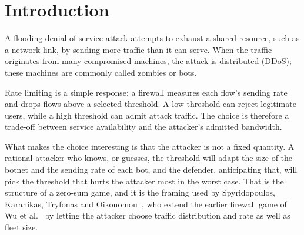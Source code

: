 \documentclass[conference]{IEEEtran}
\begin{document}
\section{Introduction}
A flooding denial-of-service attack attempts to exhaust a shared resource, such as a network link, by sending more traffic than it can serve. When the traffic originates from many compromised machines, the attack is distributed (DDoS); these machines are commonly called zombies or bots.

Rate limiting is a simple response: a firewall measures each flow's sending rate and drops flows above a selected threshold. A low threshold can reject legitimate users, while a high threshold can admit attack traffic. The choice is therefore a trade-off between service availability and the attacker's admitted bandwidth.

What makes the choice interesting is that the attacker is not a fixed quantity. A rational attacker who knows, or guesses, the threshold will adapt the size of the botnet and the sending rate of each bot, and the defender, anticipating that, will pick the threshold that hurts the attacker most in the worst case. That is the structure of a zero-sum game, and it is the framing used by Spyridopoulos, Karanikas, Tryfonas and Oikonomou~\cite{spyridopoulos2013}, who extend the earlier firewall game of Wu et al.~\cite{wu2010} by letting the attacker choose traffic distribution and rate as well as fleet size.
\end{document}

